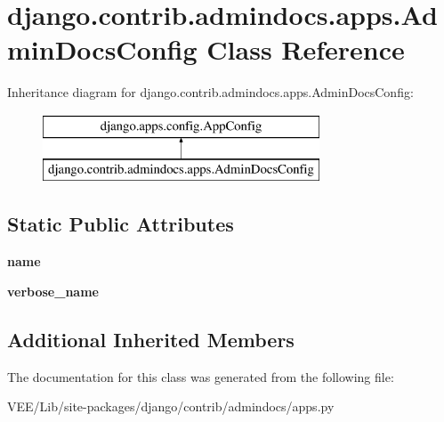 \hypertarget{classdjango_1_1contrib_1_1admindocs_1_1apps_1_1_admin_docs_config}{}\section{django.\+contrib.\+admindocs.\+apps.\+Admin\+Docs\+Config Class Reference}
\label{classdjango_1_1contrib_1_1admindocs_1_1apps_1_1_admin_docs_config}
Inheritance diagram for django.\+contrib.\+admindocs.\+apps.\+Admin\+Docs\+Config\+:\begin{figure}[H]
\begin{center}
\leavevmode
\includegraphics[height=2.000000cm]{classdjango_1_1contrib_1_1admindocs_1_1apps_1_1_admin_docs_config}
\end{center}
\end{figure}
\subsection*{Static Public Attributes}
\begin{DoxyCompactItemize}
\item 
\mbox{\label{classdjango_1_1contrib_1_1admindocs_1_1apps_1_1_admin_docs_config_aab0269aad1a56837c292110a39906f6d}} 
{\bfseries name}
\item 
\mbox{\label{classdjango_1_1contrib_1_1admindocs_1_1apps_1_1_admin_docs_config_aa176295e1348d365508c24c38735c4d1}} 
{\bfseries verbose\+\_\+name}
\end{DoxyCompactItemize}
\subsection*{Additional Inherited Members}


The documentation for this class was generated from the following file\+:\begin{DoxyCompactItemize}
\item 
V\+E\+E/\+Lib/site-\/packages/django/contrib/admindocs/apps.\+py\end{DoxyCompactItemize}
